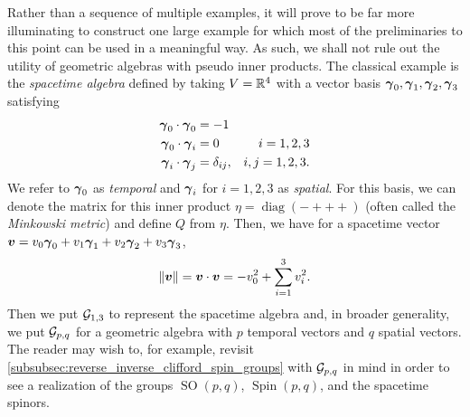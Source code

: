 Rather than a sequence of multiple examples, it will prove to be far more illuminating to construct one large example for which most of the preliminaries to this point can be used in a meaningful way. As such, we shall not rule out the utility of geometric algebras with pseudo inner products. The classical example is the \emph{spacetime algebra} defined by taking $V=\mathbb{R}^4$ with a vector basis $\boldsymbol{\gamma}_0,\boldsymbol{\gamma}_1,\boldsymbol{\gamma}_2,\boldsymbol{\gamma}_3$ satisfying
\begin{subequations}
\begin{align}
\boldsymbol{\gamma}_0 \cdot \boldsymbol{\gamma}_0 &= -1\\
\boldsymbol{\gamma}_0 \cdot \boldsymbol{\gamma}_i &= 0  &i=1,2,3\\
\boldsymbol{\gamma}_i \cdot \boldsymbol{\gamma}_j &= \delta_{ij}, &i,j=1,2,3.
\end{align}
\end{subequations}
We refer to $\boldsymbol{\gamma}_0$ as \emph{temporal} and $\boldsymbol{\gamma}_i$ for $i=1,2,3$ as \emph{spatial}. For this basis, we can denote the matrix for this inner product $\eta =\operatorname{diag}(-+++)$ (often called the \emph{Minkowski metric}) and define $Q$ from $\eta$. Then, we have for a spacetime vector $\boldsymbol{v} = v_0 \boldsymbol{\gamma}_0 +v_1 \boldsymbol{\gamma}_1 + v_2 \boldsymbol{\gamma}_2 + v_3 \boldsymbol{\gamma}_3$,
\begin{equation}
\label{eq:spacetime_inner_product}
\|\boldsymbol{v}\| = \boldsymbol{v} \cdot \boldsymbol{v} = -v_0^2 + \sum_{i=1}^3 v_i^2.
\end{equation}
Then we put $\mathcal{G}_{1,3}$ to represent the spacetime algebra and, in broader generality, we put $\mathcal{G}_{p,q}$ for a geometric algebra with $p$ temporal vectors and $q$ spatial vectors. The reader may wish to, for example, revisit \cref{subsubsec:reverse_inverse_clifford_spin_groups} with $\mathcal{G}_{p,q}$ in mind in order to see a realization of the groups $\operatorname{SO}(p,q)$, $\operatorname{Spin}(p,q)$, and the spacetime spinors.

